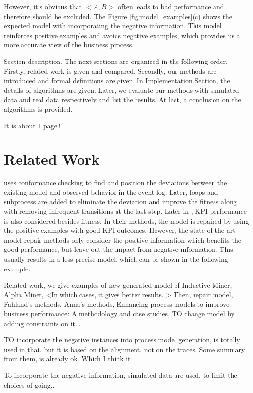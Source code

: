 \documentclass[]{article}
\begin{document}
However, it's obvious that $<A,B>$ often leads to bad performance and therefore should be excluded. The Figure \ref{fig:model_examples}(c) shows the expected model with incorporating the negative information. This model reinforces positive examples and avoids negative examples, which provides us a more accurate view of the business process.

Section description. The next sections are organized in the following order. Firstly, related work is given and compared. Secondly, our methods are introduced and formal definitions are given. In Implementation Section, the details of algorithms are given. Later, we evaluate our methods with simulated data and real data respectively and list the results. At last, a conclusion on the algorithms is provided. 

It is about 1 page!!
\section{Related Work}
\cite{fahland2015model} uses conformance checking to find and position the deviations between the existing model and observed behavior in the event log. Later, loops and subprocess are added to eliminate the deviation and improve the fitness along with removing infrequent transitions at the last step. Later in \cite{Dees} \cite{Anja}, KPI performance is also considered besides fitness. In their methods, the model is repaired by using the positive examples with good KPI outcomes. However, the state-of-the-art model repair methods only consider the positive information which benefits the good performance, but leave out the impact from negative information. This usually results in a less precise model, which can be shown in the following example.

Related work, we give examples of new-generated model of Inductive Miner, Alpha Miner, <In which cases, it gives better results. > 
Then, repair model, 
Fahland's methods,  
Anna's methods,
Enhancing process models to improve business performance: A methodology and case studies, TO change model by adding constraints on it... 

TO incorporate the negative instances into process model generation, is totally used in that, but it is based on the alignment, not on the traces.  Some summary from them, is already ok. 
Which I think it 

To incorporate the negative information, simulated data are used, to limit the choices of going..
\end{document}
